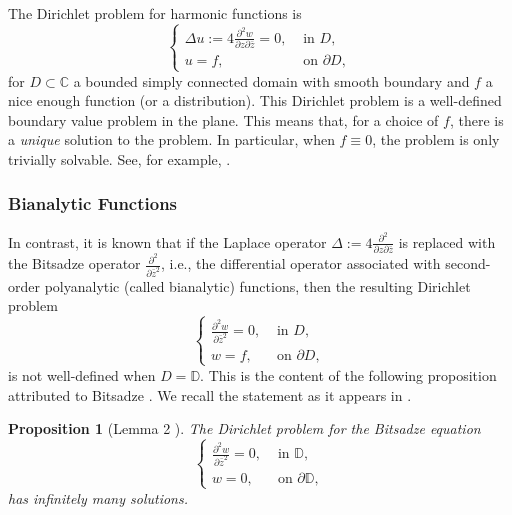 \documentclass[12pt,reqno]{amsart}
\newtheorem{prop}[theorem]{Proposition}
\theoremstyle{definition}
\theoremstyle{remark}
\newcommand{\p}{\partial}
\newcommand{\z}{\bar z}
\newcommand{\disk}{\mathbb{D}}
\begin{document}
            The Dirichlet problem for harmonic functions is
            \begin{equation}\label{eq: classicaldirichlet}
                \begin{cases}
                    \Delta u := 4 \frac{\p^2 w}{\p z \p\z} = 0,  & \text{ in } D,\\
                    u = f, & \text{ on } \p D,
                \end{cases}
            \end{equation}
            for $D \subset \mathbb{C}$ a bounded simply connected domain with smooth boundary and $f$ a nice enough function (or a distribution). This Dirichlet problem is a well-defined boundary value problem in the plane. This means that, for a choice of $f$, there is a \textit{unique} solution to the problem. In particular, when $f \equiv 0$, the problem is only trivially solvable. See, for example, \cite{GK,BegBook, Straube}. 


        \subsubsection{Bianalytic Functions}\label{sec: 2.2.2}



            In contrast, it is known that if the Laplace operator $\Delta := 4 \frac{\p^2 }{\p z \p\z}$ is replaced with the Bitsadze operator $\frac{\p^2 }{\p\z^2}$, i.e., the differential operator associated with second-order polyanalytic (called bianalytic) functions, then the resulting Dirichlet problem 
            \[
                \begin{cases}
                    \frac{\p^2 w}{\p\z^2} = 0,  & \text{ in } D,\\
                    w = f, & \text{ on } \p D,
                \end{cases}
            \]
            is not well-defined when $D = \disk$. This is the content of the following proposition attributed to Bitsadze \cite{Bitsadze1948}. We recall the statement as it appears in \cite{Beg04}. 

            \begin{prop}[Lemma 2 \cite{Beg04}]\label{prop: dirichletbianalyticcircle}
                The Dirichlet problem for the Bitsadze equation
                \begin{equation}\label{eq: classicBitsadzeDirichlet}
                    \begin{cases}
                    \frac{\p^2 w}{\p\z^2} = 0,  & \text{ in } \disk,\\
                    w = 0, & \text{ on } \p \disk,
                \end{cases}
                \end{equation}
                has infinitely many solutions.
            \end{prop}
\end{document}
